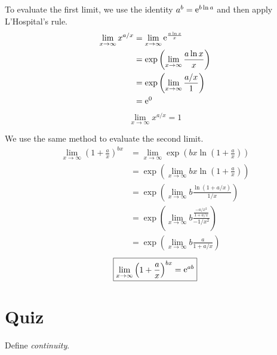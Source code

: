 \begin{Solution}
  \label{solution lim x a/x}
  To evaluate the first limit, we use the identity $a^b = \mathop{\mathrm{e}}\nolimits^{b \ln a}$
  and then apply L'Hospital's rule.
  \begin{align*}
    \lim_{x \to \infty} x^{a/x}
    &= \lim_{x \to \infty} \mathop{\mathrm{e}}\nolimits^{\frac{a \ln x}{x} } \\
    &= \exp \left( \lim_{x \to \infty} \frac{a \ln x}{x} \right) \\
    &= \exp \left( \lim_{x \to \infty} \frac{a / x}{1} \right) \\
    &= \mathop{\mathrm{e}}\nolimits^0
  \end{align*}
  \[
  \boxed{
    \lim_{x \to \infty} x^{a/x} = 1
    }
  \]

  We use the same method to evaluate the second limit.
  \begin{align*}
    \lim_{x \to \infty} \left( 1 + \frac{a}{x} \right)^{b x}
    &= \lim_{x \to \infty} \exp \left( b x
      \ln \left( 1 + \frac{a}{x} \right) \right) \\
    &= \exp \left( \lim_{x \to \infty} b x
      \ln \left( 1 + \frac{a}{x} \right) \right) \\
    &= \exp \left( \lim_{x \to \infty} b
      \frac{\ln( 1 + a/x )}{1/x} \right) \\
    &= \exp \left( \lim_{x \to \infty} b
      \frac{\frac{-a/x^2}{1+a/x}}{-1/x^2} \right) \\
    &= \exp \left( \lim_{x \to \infty} b
      \frac{a}{1+a/x} \right)
  \end{align*}
  \[
  \boxed{
    \lim_{x \to \infty} \left( 1 + \frac{a}{x} \right)^{b x} = \mathop{\mathrm{e}}\nolimits^{a b}
    }
  \]
\end{Solution}








\raggedbottom
\pagebreak
\flushbottom
\section{Quiz}

\begin{QuizProblem}
  \label{quiz problem define continuity}
  Define \textit{continuity}.

\end{QuizProblem}


